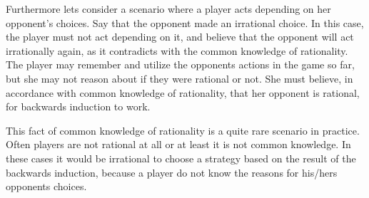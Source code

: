 Furthermore lets consider a scenario where a player acts depending on her opponent's choices. Say that the opponent made an irrational choice. In this case, the player must not act depending on it, and believe that the opponent will act irrationally again, as it contradicts with the common knowledge of rationality. The player may remember and utilize the opponents actions in the game so far, but she may not reason about if they were rational or not. She must believe, in accordance with common knowledge of rationality, that her opponent is rational, for backwards induction to work.

This fact of common knowledge of rationality is a quite rare scenario in practice. Often players are not rational at all or at least it is not common knowledge. In these cases it would be irrational to choose a strategy based on the result of the backwards induction, because a player do not know the reasons for his/hers opponents choices.